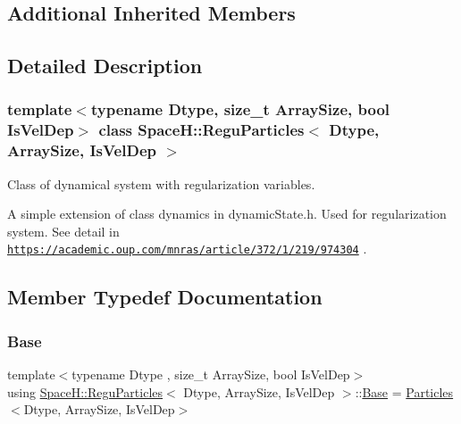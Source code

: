 \subsection*{Additional Inherited Members}


\subsection{Detailed Description}
\subsubsection*{template$<$typename Dtype, size\+\_\+t Array\+Size, bool Is\+Vel\+Dep$>$\newline
class Space\+H\+::\+Regu\+Particles$<$ Dtype, Array\+Size, Is\+Vel\+Dep $>$}

Class of dynamical system with regularization variables. 

A simple extension of class dynamics in dynamic\+State.\+h. Used for regularization system. See detail in \href{https://academic.oup.com/mnras/article/372/1/219/974304}{\tt https\+://academic.\+oup.\+com/mnras/article/372/1/219/974304} . 

\subsection{Member Typedef Documentation}
\mbox{\label{class_space_h_1_1_regu_particles_a1d863fa181a9871459539c11d18d5f10}} 
\subsubsection{\texorpdfstring{Base}{Base}}
{\footnotesize\ttfamily template$<$typename Dtype , size\+\_\+t Array\+Size, bool Is\+Vel\+Dep$>$ \\
using \mbox{\hyperlink{class_space_h_1_1_regu_particles}{Space\+H\+::\+Regu\+Particles}}$<$ Dtype, Array\+Size, Is\+Vel\+Dep $>$\+::\mbox{\hyperlink{class_space_h_1_1_regu_particles_a1d863fa181a9871459539c11d18d5f10}{Base}} =  \mbox{\hyperlink{struct_space_h_1_1_particles}{Particles}}$<$Dtype, Array\+Size, Is\+Vel\+Dep$>$}

\mbox{\label{class_space_h_1_1_regu_particles_ae2831b4f4434150ac51be629012d383d}} 
